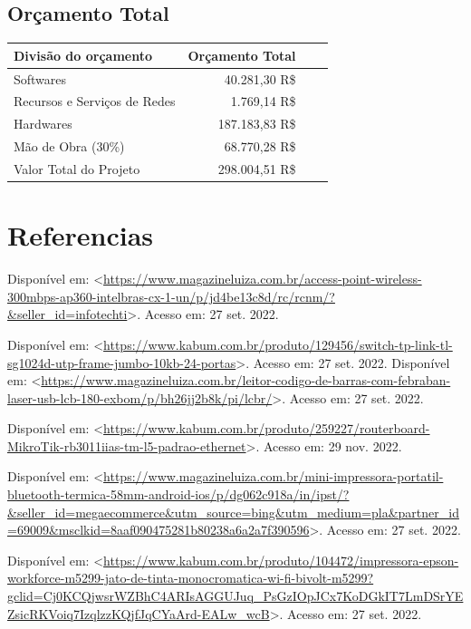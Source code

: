 \documentclass[12pt]{article}
\begin{document}
\subsection{Orçamento Total}
\begin{center}
\begin{tabular}{| l | r | r | r |}
\hline 
Divisão do orçamento & Orçamento Total\\
\hline
Softwares & 40.281,30 R\$\\
Recursos e Serviços de Redes & 1.769,14 R\$\\
Hardwares & 187.183,83 R\$\\
Mão de Obra (30\%) & 68.770,28 R\$\\
Valor Total do Projeto & 298.004,51 R\$\\
\hline
\end{tabular}
\end{center}

\section{Referencias}



Disponível em: <\url{https://www.magazineluiza.com.br/access-point-wireless-300mbps-ap360-intelbras-cx-1-un/p/jd4be13c8d/rc/rcnm/?&seller_id=infotechti}>. Acesso em: 27 set. 2022.

Disponível em: <\url{https://www.kabum.com.br/produto/129456/switch-tp-link-tl-sg1024d-utp-frame-jumbo-10kb-24-portas}>. Acesso em: 27 set. 2022.
Disponível em: <\url{https://www.magazineluiza.com.br/leitor-codigo-de-barras-com-febraban-laser-usb-lcb-180-exbom/p/bh26jj2b8k/pi/lcbr/}>. Acesso em: 27 set. 2022.

Disponível em: <\url{https://www.kabum.com.br/produto/259227/routerboard-MikroTik-rb3011iias-tm-l5-padrao-ethernet}>. Acesso em: 29 nov. 2022.

Disponível em: <\url{https://www.magazineluiza.com.br/mini-impressora-portatil-bluetooth-termica-58mm-android-ios/p/dg062c918a/in/ipst/?&seller_id=megaecommerce&utm_source=bing&utm_medium=pla&partner_id=69009&msclkid=8aaf090475281b80238a6a2a7f390596}>. Acesso em: 27 set. 2022.

Disponível em: <\url{https://www.kabum.com.br/produto/104472/impressora-epson-workforce-m5299-jato-de-tinta-monocromatica-wi-fi-bivolt-m5299?gclid=Cj0KCQjwsrWZBhC4ARIsAGGUJuq_PsGzIOpJCx7KoDGkIT7LmDSrYEZsicRKVoiq7IzqlzzKQjfJqCYaArd-EALw_wcB}>. Acesso em: 27 set. 2022.
\end{document}
